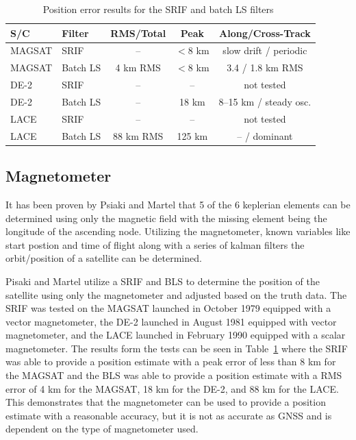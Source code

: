 \documentclass[conference]{IEEEtran}
\begin{document}
\begin{table}[htbp]
\centering
\caption{Position error results for the SRIF and batch LS filters~\cite{psiakiGroundTestsMagnetometerbased1993}}
\label{tab:magnav_results}
\scriptsize
\setlength{\tabcolsep}{3pt}
\begin{tabular}{|l|l|c|c|c|}
\hline
S/C & Filter & RMS/Total & Peak & Along/Cross-Track \\
\hline
MAGSAT & SRIF      & --        & $<$8 km & slow drift / periodic \\
\hline
MAGSAT & Batch LS  & 4 km RMS  & $<$8 km & 3.4 / 1.8 km RMS \\
\hline
DE-2   & SRIF      & --        & --      & not tested \\
\hline
DE-2   & Batch LS  & --        & 18 km   & 8--15 km / steady osc. \\
\hline
LACE   & SRIF      & --        & --      & not tested \\
\hline
LACE   & Batch LS  & 88 km RMS & 125 km  & -- / dominant \\
\hline
\end{tabular}
\end{table}


\subsection{Magnetometer}
It has been proven by Psiaki and Martel\cite{psiakiAutonomousMagneticNavigation} that 5 of the 6 keplerian elements can be determined using only the magnetic field with the missing element being the longitude of the ascending node. Utilizing the magnetometer, known variables like start postion and time of flight along with a series of kalman filters the orbit/position of a satellite can be determined\cite{ningAnalysisFilteringMethods2011,deutschmannEvaluationAttitudeOrbit2000}. 

Pisaki and Martel\cite{psiakiGroundTestsMagnetometerbased1993} utilize a \ac{SRIF} and \ac{BLS} to determine the position of the satellite using only the magnetometer and adjusted based on the truth data. The \ac{SRIF} was tested on the \ac{MAGSAT} launched in October 1979 equipped with a vector magnetometer, the \ac{DE-2} launched in August 1981 equipped with vector magnetometer, and the \ac{LACE} launched in February 1990 equipped with a scalar magnetometer. The results form the tests can be seen in Table~\ref{tab:magnav_results} where the \ac{SRIF} was able to provide a position estimate with a peak error of less than 8 km for the \ac{MAGSAT} and the \ac{BLS} was able to provide a position estimate with a \ac{RMS} error of 4 km for the \ac{MAGSAT}, 18 km for the \ac{DE-2}, and 88 km for the \ac{LACE}\cite{psiakiGroundTestsMagnetometerbased1993}. This demonstrates that the magnetometer can be used to provide a position estimate with a reasonable accuracy, but it is not as accurate as \ac{GNSS} and is dependent on the type of magnetometer used.
\end{document}
